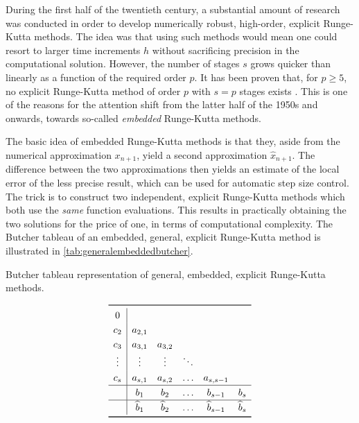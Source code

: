 During the first half of the twentieth century, a substantial amount of research
was conducted in order to develop numerically robust, high-order, explicit
Runge-Kutta methods. The idea was that using such methods would mean one could
resort to larger time increments $h$ without sacrificing precision in the
computational solution. However, the number of stages $s$ grows quicker than
linearly as a function of the required order $p$. It has been proven
that, for $p\geq5$, no explicit Runge-Kutta method of order $p$ with $s=p$
stages exists \parencite[p.173 in the 2008 printing]{hairer1993solving}. This is
one of the reasons for the attention shift from the latter half of the 1950s
and onwards, towards so-called \emph{embedded} Runge-Kutta methods.

The basic idea of embedded Runge-Kutta methods is that they, aside from the
numerical approximation $x_{n+1}$, yield a second approximation
$\widehat{x}_{n+1}$. The difference between the two approximations then yields
an estimate of the local error of the less precise result, which can be used for
automatic step size control. The trick is to construct two independent, explicit
Runge-Kutta methods which both use the \emph{same} function evaluations. This
results in practically obtaining the two solutions for the price of one, in
terms of computational complexity. The Butcher tableau of an embedded, general,
explicit Runge-Kutta method is illustrated in
\cref{tab:generalembeddedbutcher}.

\begin{table}[htpb]
    \centering
    \caption[Butcher tableau representation of general, embedded, explicit
    Runge-Kutta methods]{Butcher tableau representation of general, embedded,
        explicit Runge-Kutta methods.}
    \label{tab:generalembeddedbutcher}
    \[\renewcommand{\arraystretch}{1.25}
    \begin{array}{c|ccccc}
    \toprule
    0 \\
    c_{2} & a_{2,1} \\
    c_{3} & a_{3,1} & a_{3,2} \\
    \vdots & \vdots & \vdots & \ddots\\
    c_{s} & a_{s,1} & a_{s,2} & \ldots & a_{s,s-1}\\
    \hline
    & b_{1} & b_{2} & \ldots & b_{s-1} & b_{s} \\
    \hline
    & \widehat{b}_{1} & \widehat{b}_{2} & \ldots & \widehat{b}_{s-1}& \widehat{b}_{s}\\
    \bottomrule
    \end{array}
\]
\end{table}

